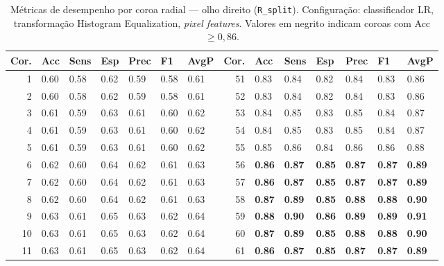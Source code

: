 \documentclass[11pt,a4paper]{article}
\begin{document}
\begin{table}[htbp]
\centering
\caption{Métricas de desempenho por coroa radial --- olho direito (\texttt{R\_split}). Configuração: classificador LR, transformação Histogram Equalization, \textit{pixel features}. Valores em negrito indicam coroas com Acc $\geq 0{,}86$.}
\label{tab:coroas-radiais-R}
\tiny
\setlength{\tabcolsep}{2.5pt}
\renewcommand{\arraystretch}{1.05}
\begin{tabular}{rllllll@{\hspace{8pt}}rllllll}
\toprule
\textbf{Cor.} & \textbf{Acc} & \textbf{Sens} & \textbf{Esp} & \textbf{Prec} & \textbf{F1} & \textbf{AvgP} &
\textbf{Cor.} & \textbf{Acc} & \textbf{Sens} & \textbf{Esp} & \textbf{Prec} & \textbf{F1} & \textbf{AvgP} \\
\midrule
1 & 0.60 & 0.58 & 0.62 & 0.59 & 0.58 & 0.61 & 51 & 0.83 & 0.84 & 0.82 & 0.84 & 0.83 & 0.86 \\
2 & 0.60 & 0.58 & 0.62 & 0.59 & 0.58 & 0.61 & 52 & 0.83 & 0.84 & 0.82 & 0.84 & 0.83 & 0.86 \\
3 & 0.61 & 0.59 & 0.63 & 0.61 & 0.60 & 0.62 & 53 & 0.84 & 0.85 & 0.83 & 0.85 & 0.84 & 0.87 \\
4 & 0.61 & 0.59 & 0.63 & 0.61 & 0.60 & 0.62 & 54 & 0.84 & 0.85 & 0.83 & 0.85 & 0.84 & 0.87 \\
5 & 0.61 & 0.59 & 0.63 & 0.61 & 0.60 & 0.62 & 55 & 0.85 & 0.86 & 0.84 & 0.86 & 0.86 & 0.88 \\
6 & 0.62 & 0.60 & 0.64 & 0.62 & 0.61 & 0.63 & 56 & \textbf{0.86} & \textbf{0.87} & \textbf{0.85} & \textbf{0.87} & \textbf{0.87} & \textbf{0.89} \\
7 & 0.62 & 0.60 & 0.64 & 0.62 & 0.61 & 0.63 & 57 & \textbf{0.86} & \textbf{0.87} & \textbf{0.85} & \textbf{0.87} & \textbf{0.87} & \textbf{0.89} \\
8 & 0.62 & 0.60 & 0.64 & 0.62 & 0.61 & 0.63 & 58 & \textbf{0.87} & \textbf{0.89} & \textbf{0.85} & \textbf{0.88} & \textbf{0.88} & \textbf{0.90} \\
9 & 0.63 & 0.61 & 0.65 & 0.63 & 0.62 & 0.64 & 59 & \textbf{0.88} & \textbf{0.90} & \textbf{0.86} & \textbf{0.89} & \textbf{0.89} & \textbf{0.91} \\
10 & 0.63 & 0.61 & 0.65 & 0.63 & 0.62 & 0.64 & 60 & \textbf{0.87} & \textbf{0.89} & \textbf{0.85} & \textbf{0.88} & \textbf{0.88} & \textbf{0.90} \\
11 & 0.63 & 0.61 & 0.65 & 0.63 & 0.62 & 0.64 & 61 & \textbf{0.86} & \textbf{0.87} & \textbf{0.85} & \textbf{0.87} & \textbf{0.87} & \textbf{0.89} \\

\end{tabular}
\end{table}
\end{document}
